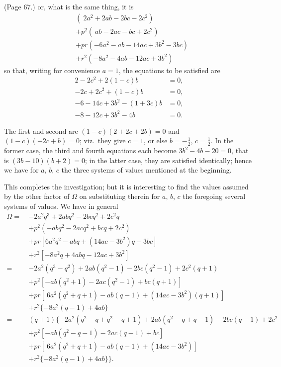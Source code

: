 \documentclass[11pt,a4paper]{article}
\begin{document}
\bigskip

\noindent (Page 67.) or, what is the same thing, it is
\begin{align*}
& (\ 2a^2 + 2ab - 2bc - 2c^2) \\
& + p^2 (\ ab - 2ac - bc + 2c^2) \\
& + pr (-6a^2 - ab - 14ac + 3b^2 - 3bc) \\
& + r^2 (-8a^2 - 4ab - 12ac + 3b^2)
\end{align*}
so that, writing for convenience $a = 1$, the equations to be satisfied are
\begin{align*}
2 - 2c^2 + 2(1 - c) b &= 0, \\
-2c + 2c^2 + (1 - c) b &= 0, \\
-6 - 14c + 3b^2 - (1 + 3c) b &= 0, \\
-8 - 12c + 3b^2 - 4b &= 0.
\end{align*}

The first and second are $(1 - c)(2 + 2c + 2b) = 0$ and $(1 - c)(-2c + b) = 0$; viz.\ they give $c = 1$, or else $b = -\tfrac{1}{2}$, $c = \tfrac{1}{2}$. In the former case, the third and fourth equations each become $3b^2 - 4b - 20 = 0$, that is $(3b - 10)(b + 2) = 0$; in the latter case, they are satisfied identically; hence we have for $a$, $b$, $c$ the three systems of values mentioned at the beginning.

This completes the investigation; but it is interesting to find the values assumed by the other factor of $\Omega$ on substituting therein for $a$, $b$, $c$ the foregoing several systems of values. We have in general
\begin{align*}
\Omega = \ & -2a^2 q^3 + 2ab q^2 - 2bc q^2 + 2c^2 q \\
& + p^2 (-ab q^2 - 2ac q^2 + bc q + 2c^2) \\
& + pr [6a^2 q^2 - ab q + (14ac - 3b^2) q - 3bc] \\
& + r^2 [-8a^2 q + 4ab q - 12ac + 3b^2] \\
= \ & -2a^2 (q^3 - q^2) + 2ab(q^2 - 1) - 2bc(q^2 - 1) + 2c^2 (q + 1) \\
& + p^2 [-ab (q^2 + 1) - 2ac(q^2 - 1) + bc(q + 1)] \\
& + pr [\ 6a^2 (q^2 + q + 1) - ab(q - 1) + (14ac - 3b^2)(q + 1)] \\
& + r^2 \{-8a^2 (q - 1) + 4ab\} \\
= \ & (q + 1) \{-2a^2 (q^2 - q + q^2 - q + 1) + 2ab(q^2 - q + q - 1) - 2bc(q - 1) + 2c^2 \\
& + p^2 [-ab(q^2 - q - 1) - 2ac(q - 1) + bc] \\
& + pr [\ 6a^2 (q^2 + q + 1) - ab(q - 1) + (14ac - 3b^2)] \\
& + r^2 \{-8a^2 (q - 1) + 4ab\} \}.
\end{align*}
\end{document}
